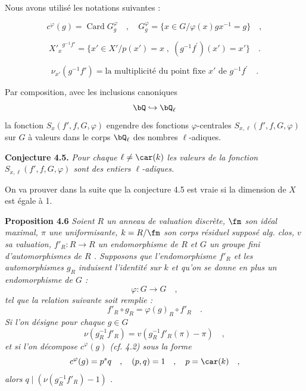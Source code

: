 Nous avons utilisé les notations suivantes :

\begin{equation}\tag{4.2}
c^\varphi(g) = \operatorname{Card} G_g^\varphi \quad , \quad G_g^\varphi = \{ x \in G / \varphi(x)gx^{-1} = g \} \quad ,
\end{equation}

\begin{equation}\tag{4.3}
{X'_x}^{g^{-1}f'} = \{ x' \in X' / p(x') = x \; , \; (g^{-1}f^{\prime})(x') = x' \} \quad .
\end{equation}

\begin{equation}\tag{4.4}
\nu_{x'}(g^{-1}f') = \text{la multiplicité du point fixe } x' \text{ de } g^{-1}f^{\prime} \quad .
\end{equation}

Par composition, avec les inclusions canoniques
\[
\bQ \hookrightarrow \bQ_\ell
\]
la
fonction $S_x(f',f,G,\varphi)$ engendre des fonctions $\varphi$-centrales $S_{x,\ell}(f',f,G,\varphi)$ sur $G$ à valeurs dans le corps $\bQ_\ell$ des nombres $\ell$-adiques.

\medskip
\noindent
\textbf{Conjecture 4.5.} \emph{Pour chaque $\ell \neq \car(k)$ les valeurs de la fonction $S_{x,\ell}(f',f,G,\varphi)$ sont des entiers $\ell$-adiques.}

\medskip

On va prouver dans la suite que la conjecture 4.5 est vraie si la dimension de $X$ est égale à 1.

\medskip
\noindent
\textbf{Proposition 4.6} \emph{Soient $R$ un anneau de valuation discrète, $\fm$ son idéal maximal, $\pi$ une uniformisante, $k = R/\fm$ son corps résiduel supposé alg. clos, $v$ sa valuation, $f'_R : R \to R$ un endomorphisme de $R$ et $G$ un groupe fini d'automorphismes de $R$ . Supposons que l'endomorphisme $f'_R$ et les automorphismes $g_R$ induisent l'identité sur $k$ et qu'on se donne en plus un endomorphisme de $G$ :
\[
\varphi : G \longrightarrow G \quad ,
\]
tel que la relation suivante soit remplie :
\[
f'_R \circ g_R = \varphi(g)_R \circ f'_R \quad .
\]
Si l'on désigne pour chaque $g \in G$
\[
\nu(g_R^{-1}f'_R) = v(g_R^{-1}f'_R(\pi) - \pi) \quad ,
\]
et si l'on décompose $c^\varphi(g)$ (cf. 4.2) sous la forme
\[
c^\varphi(g) = p^s q \quad , \quad (p,q) = 1 \quad , \quad p = \car(k) \quad ,
\]
alors $q \mid (\nu(g_R^{-1}f'_R) - 1)$ .}

